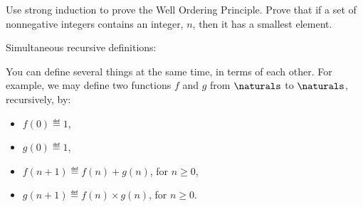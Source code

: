 \begin{problems}
\practiceproblems

\classproblems


\homeworkproblems
{}


\begin{editingnotes}
\begin{problem}
Use strong induction to prove the Well Ordering Principle. \hint Prove
that if a set of nonnegative integers contains an integer, $n$, then it
has a smallest element.
\end{problem}
\end{editingnotes}

\begin{editingnotes}

Simultaneous recursive definitions:

  You can define several things at the same time, in terms of each
  other.  For example, we may define two functions $f$ and $g$ from
  $\naturals$ to $\naturals$, recursively, by:
  \begin{itemize}
  \item
    $f(0) \eqdef 1$,
  \item
    $g(0) \eqdef 1$,
  \item
    $f(n+1) \eqdef f(n) + g(n)$, for $n \geq 0$,
  \item
    $g(n+1) \eqdef f(n) \times g(n)$, for $n \geq 0$.
  \end{itemize}

\end{editingnotes}

\begin{editingnotes}


\end{editingnotes}
\end{problems}
